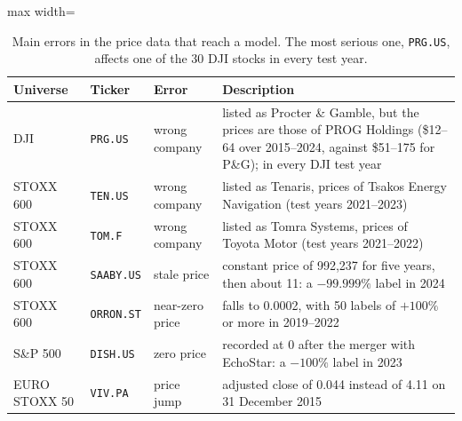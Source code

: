 \begin{table}[htbp]
    \centering
    \footnotesize
    \begin{adjustbox}{max width=\textwidth}
    \begin{tabular}{@{}lllp{7.2cm}@{}}
        \toprule
        \textbf{Universe} & \textbf{Ticker} & \textbf{Error} & \textbf{Description} \\
        \midrule
        DJI & \texttt{PRG.US} & wrong company & listed as Procter \& Gamble, but the prices are those of PROG Holdings (\$12--64 over 2015--2024, against \$51--175 for P\&G); in every DJI test year \\
        STOXX 600 & \texttt{TEN.US} & wrong company & listed as Tenaris, prices of Tsakos Energy Navigation (test years 2021--2023) \\
        STOXX 600 & \texttt{TOM.F} & wrong company & listed as Tomra Systems, prices of Toyota Motor (test years 2021--2022) \\
        STOXX 600 & \texttt{SAABY.US} & stale price & constant price of 992{,}237 for five years, then about 11: a $-99.999\%$ label in 2024 \\
        STOXX 600 & \texttt{ORRON.ST} & near-zero price & falls to 0.0002, with 50 labels of $+100\%$ or more in 2019--2022 \\
        S\&P 500 & \texttt{DISH.US} & zero price & recorded at 0 after the merger with EchoStar: a $-100\%$ label in 2023 \\
        EURO STOXX 50 & \texttt{VIV.PA} & price jump & adjusted close of 0.044 instead of 4.11 on 31 December 2015 \\
        \bottomrule
    \end{tabular}
    \end{adjustbox}
    \caption{Main errors in the price data that reach a model. The most serious one, \texttt{PRG.US}, affects one of the 30 DJI stocks in every test year.}
    \label{tab:data_errors}
\end{table}

